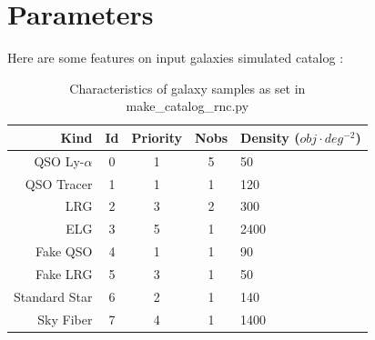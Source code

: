 \documentclass{extarticle}
\def\psqd{$obj \cdot deg^{-2}$}
\begin{document}
\section{Parameters}
Here are some features on input galaxies simulated catalog :


\begin{table}[H]\centering
	\begin{tabular}{rcccl} \hline
		Kind&Id&Priority&Nobs&Density (\psqd)\\ \hline
		QSO Ly-$\alpha$ & 0 & 1 & 5 & 50\\
		QSO Tracer & 1 & 1 & 1 & 120\\
		LRG & 2 & 3 & 2 & 300\\
		ELG & 3 & 5 & 1 & 2400\\
		Fake QSO & 4 & 1 & 1 & 90\\
		Fake LRG & 5 & 3 & 1 & 50\\
		Standard Star & 6 & 2 & 1 & 140\\
		Sky Fiber & 7 & 4 & 1 & 1400\\ \hline
	\end{tabular}
	\caption{Characteristics of galaxy samples as set in make\_catalog\_rnc.py}\label{table:characteristics}
\end{table}
\end{document}

